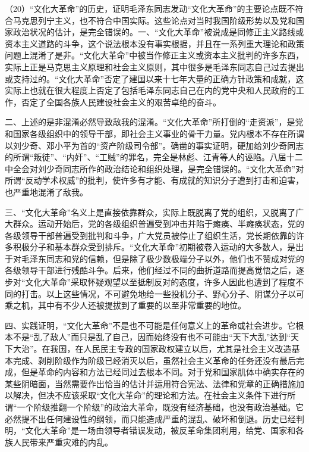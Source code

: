 （20）“文化大革命”的历史，证明毛泽东同志发动“文化大革命”的主要论点既不符合马克思列宁主义，也不符合中国实际。这些论点对当时我国阶级形势以及党和国家政治状况的估计，是完全错误的。一、“文化大革命”被说成是同修正主义路线或资本主义道路的斗争，这个说法根本没有事实根据，并且在一系列重大理论和政策问题上混淆了是非。“文化大革命”中被当作修正主义或资本主义批判的许多东西，实际上正是马克思主义原理和社会主义原则，其中很多是毛泽东同志自己过去提出或支持过的。“文化大革命”否定了建国以来十七年大量的正确方针政策和成就，这实际上也就在很大程度上否定了包括毛泽东同志自己在内的党中央和人民政府的工作，否定了全国各族人民建设社会主义的艰苦卓绝的奋斗。

二、上述的是非混淆必然导致敌我的混淆。“文化大革命”所打倒的“走资派”，是党和国家各级组织中的领导干部，即社会主义事业的骨干力量。党内根本不存在所谓以刘少奇、邓小平为首的“资产阶级司令部”。确凿的事实证明，硬加给刘少奇同志的所谓“叛徒”、“内奸”、“工贼”的罪名，完全是林彪、江青等人的诬陷。八届十二中全会对刘少奇同志所作的政治结论和组织处理，是完全错误的。“文化大革命”对所谓“反动学术权威”的批判，使许多有才能、有成就的知识分子遭到打击和迫害，也严重地混淆了敌我。

三、“文化大革命”名义上是直接依靠群众，实际上既脱离了党的组织，又脱离了广大群众。运动开始后，党的各级组织普遍受到冲击并陷于瘫痪、半瘫痪状态，党的各级领导干部普遍受到批判和斗争，广大党员被停止了组织生活，党长期依靠的许多积极分子和基本群众受到排斥。“文化大革命”初期被卷入运动的大多数人，是出于对毛泽东同志和党的信赖，但是除了极少数极端分子以外，他们也不赞成对党的各级领导干部进行残酷斗争。后来，他们经过不同的曲折道路而提高觉悟之后，逐步对“文化大革命”采取怀疑观望以至抵制反对的态度，许多人因此也遭到了程度不同的打击。以上这些情况，不可避免地给一些投机分子、野心分子、阴谋分子以可乘之机，其中有不少人还被提拔到了重要的以至非常重要的地位。

四、实践证明，“文化大革命”不是也不可能是任何意义上的革命或社会进步。它根本不是“乱了敌人”而只是乱了自己，因而始终没有也不可能由“天下大乱”达到“天下大治”。在我国，在人民民主专政的国家政权建立以后，尤其是社会主义改造基本完成、剥削阶级作为阶级已经消灭以后，虽然社会主义革命的任务还没有最后完成，但是革命的内容和方法已经同过去根本不同。对于党和国家肌体中确实存在的某些阴暗面，当然需要作出恰当的估计并运用符合宪法、法律和党章的正确措施加以解决，但决不应该采取“文化大革命”的理论和方法。在社会主义条件下进行所谓“一个阶级推翻一个阶级”的政治大革命，既没有经济基础，也没有政治基础。它必然提不出任何建设性的纲领，而只能造成严重的混乱、破坏和倒退。历史已经判明，“文化大革命”是一场由领导者错误发动，被反革命集团利用，给党、国家和各族人民带来严重灾难的内乱。

